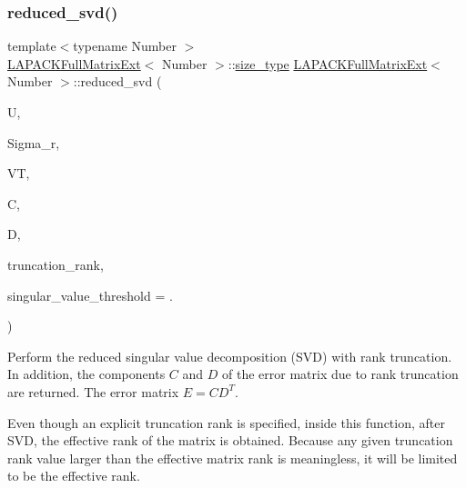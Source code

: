 \subsubsection{\texorpdfstring{reduced\+\_\+svd()}{reduced\_svd()}\hspace{0.1cm}{\footnotesize\ttfamily [2/2]}}
{\footnotesize\ttfamily template$<$typename Number $>$ \\
\hyperlink{classLAPACKFullMatrixExt}{L\+A\+P\+A\+C\+K\+Full\+Matrix\+Ext}$<$ Number $>$\+::\hyperlink{classLAPACKFullMatrixExt_a5cf5f4a6104dc17029210b5ca52bf574}{size\+\_\+type} \hyperlink{classLAPACKFullMatrixExt}{L\+A\+P\+A\+C\+K\+Full\+Matrix\+Ext}$<$ Number $>$\+::reduced\+\_\+svd (\begin{DoxyParamCaption}\item[{\hyperlink{classLAPACKFullMatrixExt}{L\+A\+P\+A\+C\+K\+Full\+Matrix\+Ext}$<$ Number $>$ \&}]{U,  }\item[{std\+::vector$<$ typename numbers\+::\+Number\+Traits$<$ Number $>$\+::real\+\_\+type $>$ \&}]{Sigma\+\_\+r,  }\item[{\hyperlink{classLAPACKFullMatrixExt}{L\+A\+P\+A\+C\+K\+Full\+Matrix\+Ext}$<$ Number $>$ \&}]{VT,  }\item[{\hyperlink{classLAPACKFullMatrixExt}{L\+A\+P\+A\+C\+K\+Full\+Matrix\+Ext}$<$ Number $>$ \&}]{C,  }\item[{\hyperlink{classLAPACKFullMatrixExt}{L\+A\+P\+A\+C\+K\+Full\+Matrix\+Ext}$<$ Number $>$ \&}]{D,  }\item[{\hyperlink{classLAPACKFullMatrixExt_a5cf5f4a6104dc17029210b5ca52bf574}{size\+\_\+type}}]{truncation\+\_\+rank,  }\item[{Number}]{singular\+\_\+value\+\_\+threshold = {.} }\end{DoxyParamCaption})}

Perform the reduced singular value decomposition (S\+VD) with rank truncation. In addition, the components $C$ and $D$ of the error matrix due to rank truncation are returned. The error matrix $E = CD^T$.


\begin{DoxyDescription}
\item[Note ]Even though an explicit truncation rank is specified, inside this function, after S\+VD, the effective rank of the matrix is obtained. Because any given truncation rank value larger than the effective matrix rank is meaningless, it will be limited to be the effective rank. 
\end{DoxyDescription}


